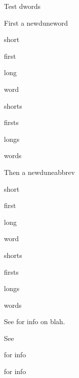\documentclass{dune}
\begin{document}
%





Test dwords

First a newduneword

short 

first 

long 

word 

shorts 

firsts 

longs 

words 

Then a newduneabbrev

short 

first 

long 

word 

shorts 

firsts 

longs 

words 





See \tcches for info on blah. 

See \tcchproj 

\tcchjpo for info

\tcchdesorg for info

\tcchie

\introchtc


\physchndk

\spchtpcelec

\dpchcalib

\tcchrev

\cleardoublepage



\end{document}

